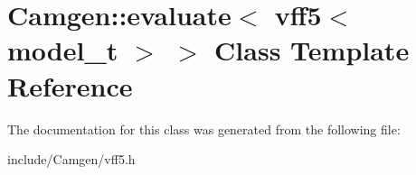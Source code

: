 \hypertarget{a00203}{}\section{Camgen\+:\+:evaluate$<$ vff5$<$ model\+\_\+t $>$ $>$ Class Template Reference}
\label{a00203}


The documentation for this class was generated from the following file\+:\begin{DoxyCompactItemize}
\item 
include/\+Camgen/vff5.\+h\end{DoxyCompactItemize}
